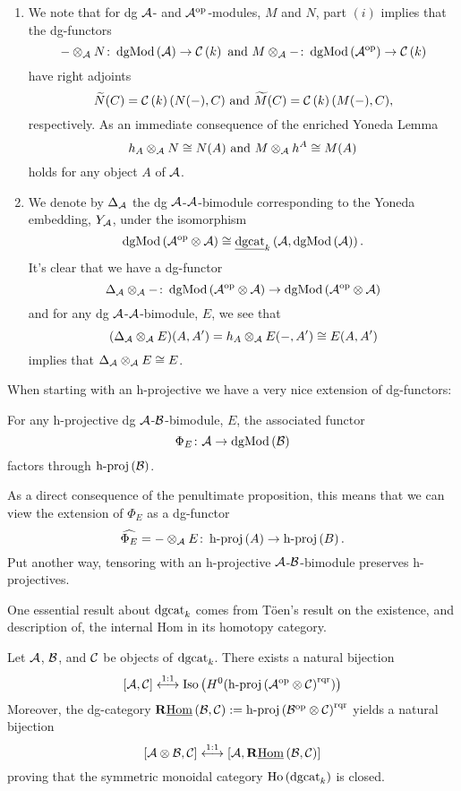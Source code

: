 \documentclass[dissertation.tex]{subfiles}
\begin{document}
\begin{remark}\label{rem: tensoring with reps}
  \begin{enumerate}
  \item
    We note that for dg \(\mathcal{A}\)- and \(\mathcal{A}^{\operatorname{op}}\)-modules, \(M\) and \(N\), part \((i)\) implies that the dg-functors
    \[- \otimes_{\mathcal{A}} N \colon \operatorname{dgMod}\left(\mathcal{A}\right) \to \mathcal{C}\left(k\right)\ \text{and}\ M \otimes_{\mathcal{A}} - \colon \operatorname{dgMod}\left(\mathcal{A}^{\operatorname{op}}\right) \to \mathcal{C}\left(k\right)\]
    have right adjoints
    \[\widetilde{N}(C) = \CH{k}(N( - ), C)\ \text{and}\ \widetilde{M}(C) = \CH{k}(M( - ), C),\]
    respectively.
    As an immediate consequence of the enriched Yoneda Lemma
    \[h_A \otimes_{\mathcal{A}} N \cong N(A)\ \text{and}\ M \otimes_{\mathcal{A}} h^A \cong M(A)\]
    holds for any object \(A\) of \(\mathcal{A}\).
  \item
    We denote by \(\Delta_{\mathcal{A}}\) the dg \(\mathcal{A}\)-\(\mathcal{A}\)-bimodule corresponding to the Yoneda embedding, \(Y_{\mathcal{A}}\), under the isomorphism
    \[\operatorname{dgMod}\left(\mathcal{A}^{\operatorname{op}} \otimes \mathcal{A}\right) \cong \underline{\operatorname{dgcat}}_{k}\left(\mathcal{A}, \operatorname{dgMod}\left(\mathcal{A}\right)\right).\]
    It's clear that we have a dg-functor
    \[\Delta_{\mathcal{A}} \otimes_{\mathcal{A}} - \colon \operatorname{dgMod}\left(\mathcal{A}^{\operatorname{op}} \otimes \mathcal{A}\right) \to \operatorname{dgMod}\left(\mathcal{A}^{\operatorname{op}} \otimes \mathcal{A}\right)\]
    and for any dg \(\mathcal{A}\)-\(\mathcal{A}\)-bimodule, \(E\), we see that
    \[(\Delta_{\mathcal{A}} \otimes_{\mathcal{A}} E)(A,A^\prime) = h_A \otimes_{\mathcal{A}} E(- , A^\prime) \cong E(A,A^\prime)\]
    implies that \(\Delta_{\mathcal{A}} \otimes_{\mathcal{A}} E \cong E\).
  \end{enumerate}
\end{remark}

When starting with an h-projective we have a very nice extension of dg-functors:
\begin{proposition}[{\cite[Lemma 3.4]{CS}}]
  For any h-projective dg \(\mathcal{A}\)-\(\mathcal{B}\)-bimodule, \(E\), the associated functor
  \[\Phi_E \colon \mathcal{A} \to \operatorname{dgMod}\left(\mathcal{B}\right)\]
  factors through \(\operatorname{h-proj}\left(\mathcal{B}\right)\).
\end{proposition}

As a direct consequence of the penultimate proposition, this means that we can view the extension of \(\Phi_E\) as a dg-functor
\[\widehat{\Phi_E} = - \otimes_{\mathcal{A}} E \colon \operatorname{h-proj}\left(A\right) \to \operatorname{h-proj}\left(B\right).\]
Put another way, tensoring with an h-projective \(\mathcal{A}\)-\(\mathcal{B}\)-bimodule preserves h-projectives.

One essential result about \(\operatorname{dgcat}_k\) comes from T\"oen's result on the existence, and description of, the internal Hom in its homotopy category. 

\begin{theorem} \label{theorem: Toen}
  Let \(\mathcal{A}\), \(\mathcal{B}\), and \(\mathcal{C}\) be objects of \(\operatorname{dgcat}_k\).
  There exists a natural bijection
  \[[\mathcal{A},\mathcal{C}] \overset{1:1}\longleftrightarrow \operatorname{Iso}\left(H^0(\operatorname{h-proj}\left(\mathcal{A}^{{\operatorname{op}}} \otimes \mathcal{C}\right)^{\operatorname{rqr}})\right)\]
  Moreover, the dg-category \(\mathbf{R}\underline{\operatorname{Hom}}\left(\mathcal{B},\mathcal{C}\right) := \operatorname{h-proj}\left(\mathcal{B}^{\operatorname{op}} \otimes \mathcal{C}\right)^{\operatorname{rqr}}\) yields a natural bijection
  \[[\mathcal{A} \otimes \mathcal{B}, \mathcal{C}] \overset{1:1}\longleftrightarrow [\mathcal{A}, \mathbf{R}\underline{\operatorname{Hom}}\left(\mathcal{B},\mathcal{C}\right)]\]
  proving that the symmetric monoidal category \(\operatorname{Ho}\left(\operatorname{dgcat}_k\right)\) is closed.
\end{theorem}
\end{document}
